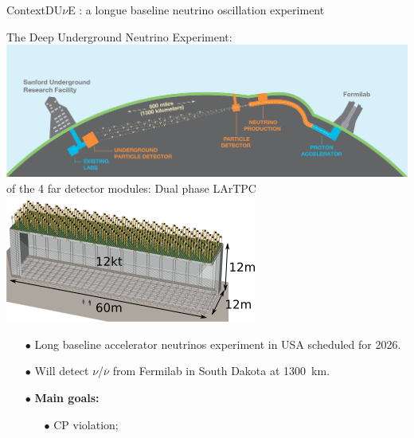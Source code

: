 \documentclass[10pt]{beamer}
\begin{document}
    \begin{frame}{Context}{DU$\nu$E : a longue baseline neutrino oscillation experiment}
    	\begin{scriptsize}
    	\begin{minipage}{0.58\textwidth}
    		\centering
    		The Deep Underground Neutrino Experiment:\\
    		\includegraphics[width=\textwidth]{figures/contexte/dune.jpg}\\
    		\vspace{0.5cm}
    		 of the 4 far detector modules: Dual phase LArTPC\\
    		\includegraphics[width=\textwidth]{figures/contexte/dune_module.png}\\
    	\end{minipage}
    	\hfill
    	\begin{minipage}{0.38\textwidth}
    		\begin{itemize}
    			\item[$\bullet$] Long baseline accelerator neutrinos experiment in USA scheduled for 2026.
    			\item[$\bullet$] Will detect $\nu$/$\overline{\nu}$ from Fermilab in South Dakota at \SI{1300}{\kilo\meter}.
    			\item[$\bullet$] \textbf{Main goals: }
	    			\begin{itemize}
	    				\item[$\bullet$] CP violation;

\end{itemize}
\end{itemize}
\end{minipage}
\end{scriptsize}
\end{frame}
\end{document}
